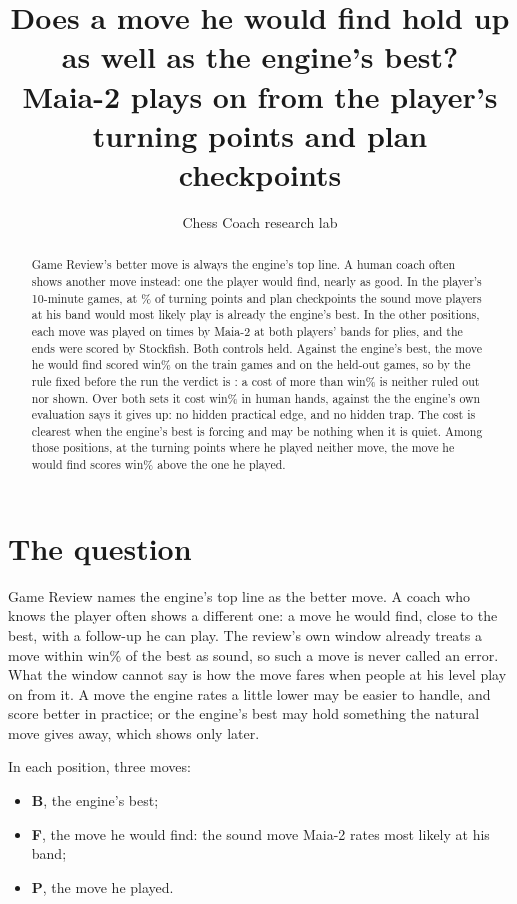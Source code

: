 \documentclass[11pt]{article}
\title{Does a move he would find hold up as well as the engine's best?\\[0.3em]
\large Maia-2 plays on from the player's turning points and plan checkpoints}
\author{Chess Coach research lab}
\date{}
\begin{document}
\maketitle

\begin{abstract}
Game Review's better move is always the engine's top line. A human coach often shows another
move instead: one the player would find, nearly as good. In the player's 10-minute games, at
\SameAsBestPct\% of turning points and plan checkpoints the sound move players at his band would
most likely play is already the engine's best. In the other \Entering{} positions, each move was
played on \Rollouts{} times by Maia-2 at both players' bands for \Plies{} plies, and the ends were
scored by Stockfish. Both controls held. Against the engine's best, the move he would find scored
\DFTrain{} win\% on the train games and \DFHeld{} on the held-out games, so by the rule fixed
before the run the verdict is \emph{\Verdict}: a cost of more than \Margin{} win\% is neither
ruled out nor shown. Over both sets it cost \MinusDF{} win\% in human hands, against the
\RootGap{} the engine's own evaluation says it gives up: no hidden practical edge, and no hidden
trap. The cost is clearest when the engine's best is forcing and may be nothing when it is quiet.
Among those positions, at the \FOverPN{} turning points where he played neither move, the move he
would find scores \FOverP{} win\% above the one he played.
\end{abstract}

\section{The question}

Game Review names the engine's top line as the better move. A coach who knows the player
often shows a different one: a move he would find, close to the best, with a follow-up he can
play. The review's own window already treats a move within \Window{} win\% of the best as sound,
so such a move is never called an error. What the window cannot say is how the move fares when
people at his level play on from it. A move the engine rates a little lower may be easier to
handle, and score better in practice; or the engine's best may hold something the natural move
gives away, which shows only later.

In each position, three moves:

\begin{itemize}[nosep]
\item \textbf{B}, the engine's best;
\item \textbf{F}, the move he would find: the sound move Maia-2 rates most likely at his band;
\item \textbf{P}, the move he played.
\end{itemize}
\end{document}
